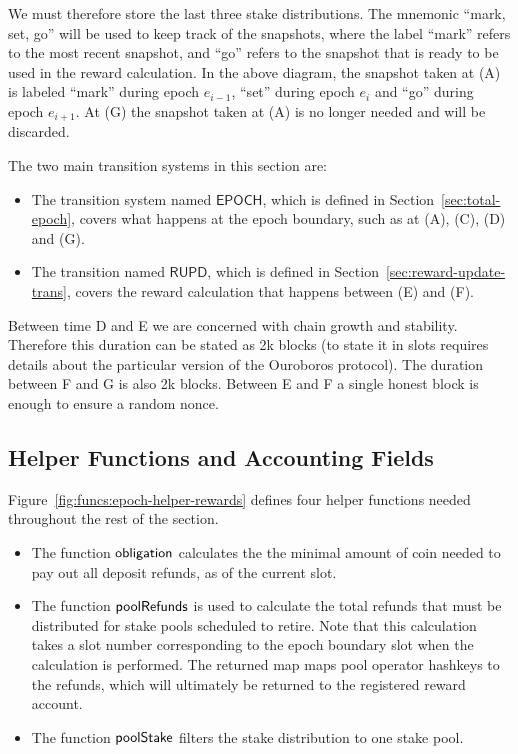We must therefore store the last three stake distributions.
The mnemonic ``mark, set, go'' will be used to keep
track of the snapshots, where the label ``mark'' refers to the most recent snapshot,
and ``go'' refers to the snapshot that is ready to be used in the reward calculation.
In the above diagram, the snapshot taken at (A) is labeled ``mark'' during epoch $e_{i-1}$,
``set'' during epoch $e_i$ and ``go'' during epoch $e_{i+1}$. At (G) the snapshot
taken at (A) is no longer needed and will be discarded.

The two main transition systems in this section are:
\begin{itemize}
  \item The transition system named $\mathsf{EPOCH}$, which is defined in
    Section~\ref{sec:total-epoch}, covers what happens at the epoch boundary,
    such as at (A), (C), (D) and (G).
  \item The transition named $\mathsf{RUPD}$, which is defined in
    Section~\ref{sec:reward-update-trans}, covers the reward calculation that
    happens between (E) and (F).
\end{itemize}


\begin{note}
  Between time D and E we are concerned with chain growth and stability.
  Therefore this duration can be stated as 2k blocks (to state it in slots requires details about
  the particular version of the Ouroboros protocol). The duration between F and G is also 2k blocks.
  Between E and F a single honest block is enough to ensure a random nonce.
\end{note}

\subsection{Helper Functions and Accounting Fields}
\label{sec:stake-dist-helpers}

Figure~\ref{fig:funcs:epoch-helper-rewards} defines four helper functions needed
throughout the rest of the section.

\begin{itemize}
  \item The function $\mathsf{obligation}$ calculates the the minimal amount of coin needed to
    pay out all deposit refunds, as of the current slot.
  \item The function $\mathsf{poolRefunds}$ is used to calculate the total refunds
    that must be distributed for stake pools scheduled to retire.
    Note that this calculation takes a slot number corresponding to the epoch boundary slot
    when the calculation is performed.  The returned map maps pool operator hashkeys to the
    refunds, which will ultimately be returned to the registered reward account.
  \item The function $\mathsf{poolStake}$ filters the stake distribution to one stake pool.
\end{itemize}



